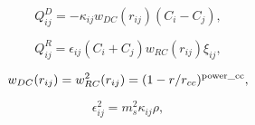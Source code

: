 \documentclass[12pt]{article}
\begin{document}
$$
  Q_{ij}^D = -\kappa_{ij} w_{DC}(r_{ij}) \left( C_i - C_j \right),
$$  
  
$$  
  Q_{ij}^R = \epsilon_{ij}\left( C_i + C_j \right) w_{RC}(r_{ij}) \xi_{ij},
$$

$$
  w_{DC}(r_{ij})=w^2_{RC}(r_{ij}) = (1 - r/r_{cc})^{\rm power\_{cc}},
$$

$$
  \epsilon_{ij}^2 = m_s^2\kappa_{ij}\rho,
$$
\end{document}
